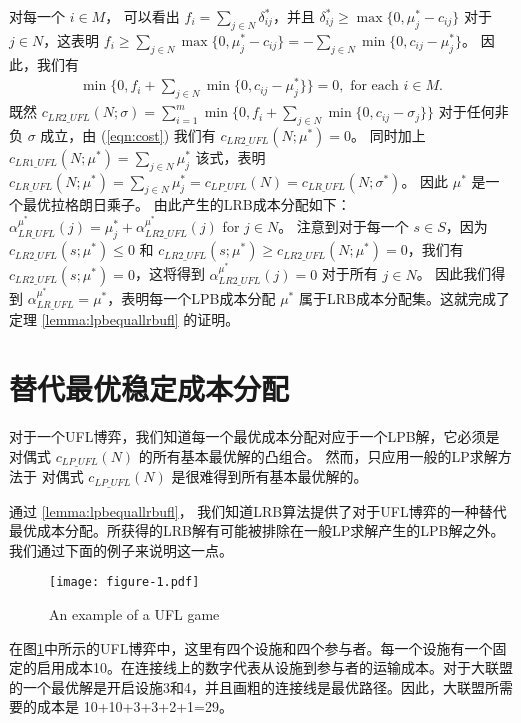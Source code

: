 \documentclass[UTF8]{article}
\begin{document}
\begin{定义}
对每一个 $i\in M$， 可以看出 $f_i = \sum_{j\in N}\delta^*_{ij}$，并且 $\delta^*_{ij}\geq \max\{0,\mu^*_j-c_{ij}\}$ 对于 $j \in N$，这表明 $f_i \geq \sum_{j\in N}\max\{0,\mu^*_j-c_{ij}\}=-\sum_{j\in N}\min\{0,c_{ij}-\mu^*_j\}$。
因此，我们有
\begin{eqnarray}
  \min\{0,f_i + \sum_{j\in N}\min\{0,c_{ij}-\mu^*_j\}\} =0, \mbox{ for each $i\in M$.} \label{eqn:cost}
\end{eqnarray}
既然 $c_{LR2\_UFL}(N;\sigma)=\sum_{i=1}^{m}\min\{0,f_i+\sum_{j\in N}\min\{0,c_{ij}-\sigma_{j}\}\}$ 对于任何非负 $\sigma$ 成立，由 (\ref{eqn:cost}) 我们有 $c_{LR2\_UFL}(N;\mu^*) = 0$。
同时加上 $c_{LR1\_UFL}(N;\mu^*)=\sum_{j\in N}\mu^*_j$ 该式，表明 $c_{LR\_UFL}(N;\mu^*) = \sum_{j\in N}\mu^*_j = c_{LP\_UFL}(N)=c_{LR\_UFL}(N;\sigma^*)$。
因此 $\mu^*$ 是一个最优拉格朗日乘子。
由此产生的LRB成本分配如下：$\alpha^{\mu^*}_{LR\_UFL}(j) = \mu^*_j + \alpha^{\mu^*}_{LR2\_UFL}(j)$ for $j \in N$。
注意到对于每一个 $s\in S$，因为 $c_{LR2\_UFL}(s;\mu^*)\leq 0$ 和 $c_{LR2\_UFL}(s;\mu^*)\geq c_{LR2\_UFL}(N;\mu^*)=0$，我们有 $c_{LR2\_UFL}(s;\mu^*)=0$，这将得到 $\alpha^{\mu^*}_{LR2\_UFL}(j) = 0$ 对于所有 $j\in N$。
因此我们得到 $\alpha^{\mu^*}_{LR\_UFL} = \mu^*$，表明每一个LPB成本分配 $\mu^*$ 属于LRB成本分配集。这就完成了定理
\ref{lemma:lpbequallrbufl} 的证明。
\hfill\Halmos

\section{替代最优稳定成本分配}\label{section:uflcomputation}
对于一个UFL博弈，我们知道每一个最优成本分配对应于一个LPB解，它必须是对偶式 $c_{LP\_UFL}(N)$ 的所有基本最优解的凸组合。 然而，只应用一般的LP求解方法于 对偶式 $c_{LP\_UFL}(N)$ 是很难得到所有基本最优解的。

通过 \ref{lemma:lpbequallrbufl}， 我们知道LRB算法提供了对于UFL博弈的一种替代最优成本分配。所获得的LRB解有可能被排除在一般LP求解产生的LPB解之外。我们通过下面的例子来说明这一点。

\begin{figure}[H]
\centering
\vspace{-0.1em}
\texttt{[image: figure-1.pdf]}
\caption{\label{figure:exampleUFL}An example of a UFL game}
\vspace{-3mm}
\end{figure}

在图\ref{figure:exampleUFL}中所示的UFL博弈中，这里有四个设施和四个参与者。每一个设施有一个固定的启用成本10。在连接线上的数字代表从设施到参与者的运输成本。对于大联盟的一个最优解是开启设施3和4，并且画粗的连接线是最优路径。因此，大联盟所需要的成本是 10+10+3+3+2+1=29。


\end{定义}
\end{document}
